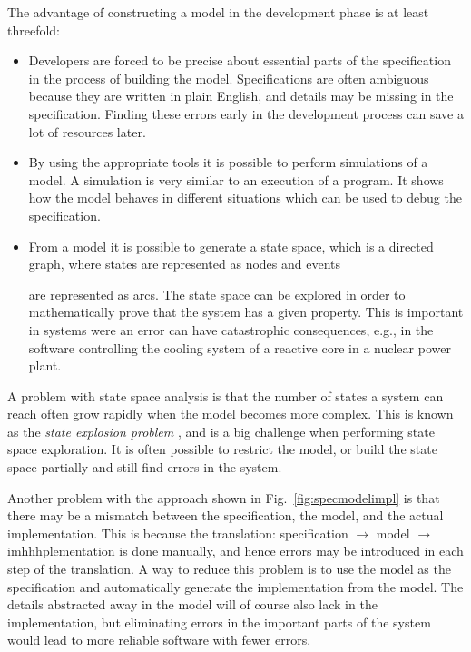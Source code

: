 The advantage of constructing a model in the development phase is at least threefold: 
\begin{itemize}
\item Developers are forced to be precise about essential parts of the specification in the process of building the model. Specifications are often ambiguous because they are written in plain English, and details may be missing in the specification. Finding these errors early in the development process can save a lot of resources later.

\item By using the appropriate tools it is possible to perform simulations of a model. A simulation is very similar to an execution of a program. It shows how the model behaves in different situations which can be used to debug the specification. 

\item From a model it is possible to generate a state space, which is a directed graph, where states are represented as nodes and events are represented as arcs. The state space can be explored in order to mathematically prove that the system has a given property. This is important in systems were an error can have catastrophic consequences, e.g., in the software controlling the cooling system of a reactive core in a nuclear power plant. 
\end{itemize}

A problem with state space analysis is that the number of states a system can reach often grow rapidly when the model becomes more complex. This is known as the \emph{state explosion problem} \cite{Val98}, and is a big challenge when performing state space exploration. It is often possible to restrict the model, or build the state space partially and still find errors in the system. 

Another problem with the approach shown in Fig.~\ref{fig:specmodelimpl} is that there may be a mismatch between the specification, the model, and the actual implementation. This is because the translation: specification $\rightarrow$ model $\rightarrow$ imhhhplementation is done manually, and hence errors may be introduced in each step of the translation. A way to reduce this problem is to use the model as the specification and automatically generate the implementation from the model. The details abstracted away in the model will of course also lack in the implementation, but eliminating errors in the important parts of the system would lead to more reliable software with fewer errors. \\

